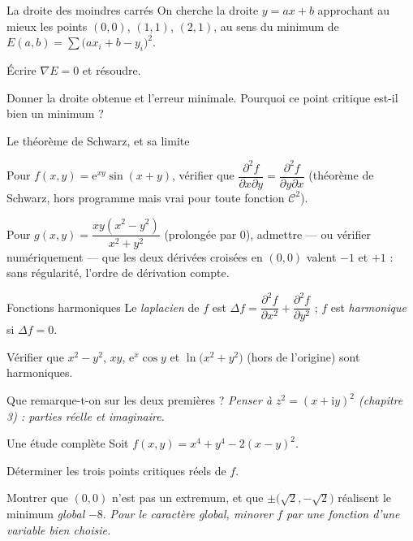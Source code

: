 \begin{exercice}[2]{La droite des moindres carrés}
On cherche la droite $y=ax+b$ approchant au mieux les points
$(0,0)$, $(1,1)$, $(2,1)$, au sens du minimum de
$E(a,b)=\sum\bigl(ax_i+b-y_i\bigr)^{2}$.
\begin{questions}
  \item Écrire $\nabla E=0$ et résoudre.
  \item Donner la droite obtenue et l'erreur minimale. Pourquoi ce point
    critique est-il bien un minimum ?
\end{questions}
\end{exercice}


\begin{exercice}[3]{Le théorème de Schwarz, et sa limite}
\begin{questions}
  \item Pour $f(x,y)=\mathrm{e}^{xy}\sin(x+y)$, vérifier que
    $\dfrac{\partial^{2}f}{\partial x\partial y}
    =\dfrac{\partial^{2}f}{\partial y\partial x}$ (théorème de Schwarz,
    hors programme mais vrai pour toute fonction $\mathcal{C}^{2}$).
  \item Pour $g(x,y)=\dfrac{xy(x^{2}-y^{2})}{x^{2}+y^{2}}$ (prolongée par
    $0$), admettre — ou vérifier numériquement — que les deux dérivées
    croisées en $(0,0)$ valent $-1$ et $+1$ : sans régularité, l'ordre
    de dérivation compte.
\end{questions}
\end{exercice}

\begin{exercice}[3]{Fonctions harmoniques}
Le \emph{laplacien} de $f$ est
$\Delta f=\dfrac{\partial^{2}f}{\partial x^{2}}
+\dfrac{\partial^{2}f}{\partial y^{2}}$ ; $f$ est \emph{harmonique} si
$\Delta f=0$.
\begin{questions}
  \item Vérifier que $x^{2}-y^{2}$, $xy$, $\mathrm{e}^{x}\cos y$ et
    $\ln\bigl(x^{2}+y^{2}\bigr)$ (hors de l'origine) sont harmoniques.
  \item Que remarque-t-on sur les deux premières ? \emph{Penser à
    $z^{2}=(x+\mathrm{i}y)^{2}$ (chapitre 3) : parties réelle et
    imaginaire.}
\end{questions}
\end{exercice}

\begin{exercice}[3]{Une étude complète}
Soit $f(x,y)=x^{4}+y^{4}-2(x-y)^{2}$.
\begin{questions}
  \item Déterminer les trois points critiques réels de $f$.
  \item Montrer que $(0,0)$ n'est pas un extremum, et que
    $\pm\bigl(\sqrt2,-\sqrt2\bigr)$ réalisent le minimum \emph{global}
    $-8$. \emph{Pour le caractère global, minorer $f$ par une fonction
    d'une variable bien choisie.}
\end{questions}
\end{exercice}

